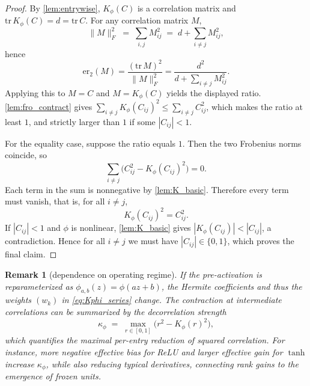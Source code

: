 \documentclass{article}
\newtheorem{remark}{Remark}[section]
\numberwithin{figure}{section}
\begin{document}
\begin{proof}
By \cref{lem:entrywise}, $K_\phi(C)$ is a correlation matrix and $\mathrm{tr}\,K_\phi(C)=d=\mathrm{tr}\,C$. For any correlation matrix $M$,
\[
\|M\|_F^2 \;=\; \sum_{i,j} M_{ij}^2 \;=\; d + \sum_{i\ne j} M_{ij}^2 ,
\]
hence
\[
\mathrm{er}_2(M)=\frac{(\mathrm{tr}\,M)^2}{\|M\|_F^2}=\frac{d^2}{d+\sum_{i\ne j} M_{ij}^2}.
\]
Applying this to $M=C$ and $M=K_\phi(C)$ yields the displayed ratio. \cref{lem:fro_contract} gives $\sum_{i\ne j} K_\phi(C_{ij})^2 \le \sum_{i\ne j} C_{ij}^2$, which makes the ratio at least $1$, and strictly larger than $1$ if some $|C_{ij}|<1$.

For the equality case, suppose the ratio equals $1$. Then the two Frobenius norms coincide, so
\[
\sum_{i\ne j} \Big( C_{ij}^2 - K_\phi(C_{ij})^2 \Big) = 0 .
\]
Each term in the sum is nonnegative by \cref{lem:K_basic}. Therefore every term must vanish, that is, for all $i\ne j$,
\[
K_\phi(C_{ij})^2 = C_{ij}^2 .
\]
If $|C_{ij}|<1$ and $\phi$ is nonlinear, \cref{lem:K_basic} gives $|K_\phi(C_{ij})|<|C_{ij}|$, a contradiction. Hence for all $i\ne j$ we must have $|C_{ij}|\in\{0,1\}$, which proves the final claim.
\end{proof}

\begin{remark}[dependence on operating regime]
\label{rem:operating_regime}
If the pre-activation is reparameterized as $\phi_{a,b}(z)=\phi(az+b)$, the Hermite coefficients and thus the weights $(w_k)$ in \eqref{eq:Kphi_series} change. The contraction at intermediate correlations can be summarized by the decorrelation strength
\[
\kappa_\phi \;=\; \max_{r\in[0,1]} \big(r^2 - K_\phi(r)^2\big),
\]
which quantifies the maximal per-entry reduction of squared correlation. For instance, more negative effective bias for ReLU and larger effective gain for $\tanh$ increase $\kappa_\phi$, while also reducing typical derivatives, connecting rank gains to the emergence of frozen units.
\end{remark}
\end{document}
